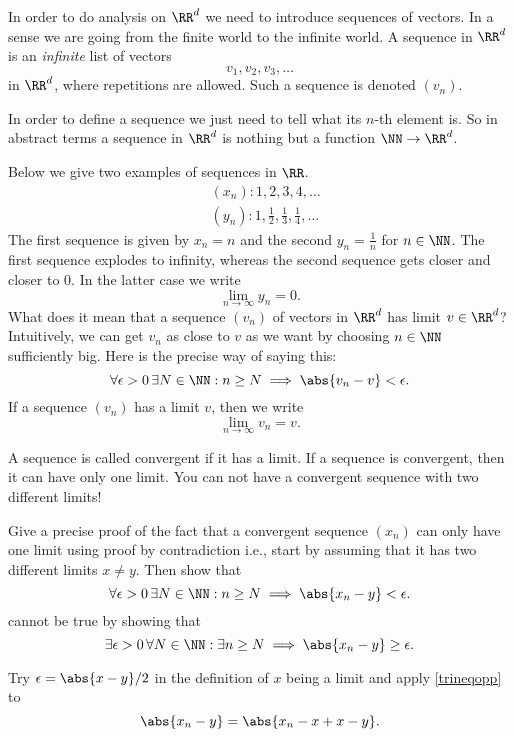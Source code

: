 \documentclass{article}
\begin{document}
In order to do analysis on $\RR^d$ we need to introduce sequences of vectors.
In a sense we are going from the finite world to the infinite world. A sequence
in  $\RR^d$ is an \emph{infinite} list of vectors
$$
v_1, v_2, v_3, \dots
$$
in $\RR^d$, where repetitions are allowed. Such a sequence is denoted $(v_n)$.

In order to define a sequence we just need to tell what its $n$-th element is. So
in abstract terms a sequence in $\RR^d$ is nothing but a function $\NN\rightarrow \RR^d$.

Below we give two examples of sequences in $\RR$.
\begin{align*}
&(x_n): 1, 2, 3, 4, \dots\\
&(y_n): 1, \tfrac{1}{2}, \tfrac{1}{3}, \tfrac{1}{4}, \dots
\end{align*}
The first sequence is given by $x_n = n$ and the second $y_n = \frac{1}{n}$ for $n\in \NN$. The first sequence
explodes to infinity, whereas the second sequence gets closer and closer to $0$. In the latter case we
write
$$
\lim_{n\to\infty} y_n = 0.
$$
What does it mean that a sequence $(v_n)$ of vectors in $\RR^d$  has limit $v\in \RR^d$? Intuitively,
we can get $v_n$ as close to $v$ as we want by choosing
$n\in \NN$ sufficiently big. Here is the precise way of saying this:
\begin{equation}\label{convdef}
\forall \epsilon > 0\, \exists N\in \NN: n\geq N\implies \abs{v_n - v} < \epsilon.
\end{equation}
If a sequence $(v_n)$ has a limit $v$, then we write
$$
\lim_{n\to\infty} v_n = v.
$$

A sequence is called convergent if it has a limit. If a sequence is convergent, then it can have
only one limit. You can not have a convergent sequence with two different limits!

\beginshex
Give a precise proof of the fact that a convergent sequence $(x_n)$ can only have
one limit using proof by contradiction i.e., start by assuming that
it has two different limits $x\neq y$. Then show that 
$$
\forall \epsilon > 0\, \exists N\in \NN: n\geq N\implies \abs{x_n - y} < \epsilon.
$$
cannot be true by showing that
$$
\exists \epsilon > 0\, \forall N\in \NN: \exists n\geq N\implies \abs{x_n - y} \geq \epsilon.
$$
\begin{hint}
  Try $\epsilon = \abs{x-y}/2$ in the definition of $x$ being a limit and apply \eqref{trineqopp} to
  $$
  \abs{x_n - y} = \abs{x_n - x + x - y}.
  $$
\end{hint}
\endshex
\end{document}
